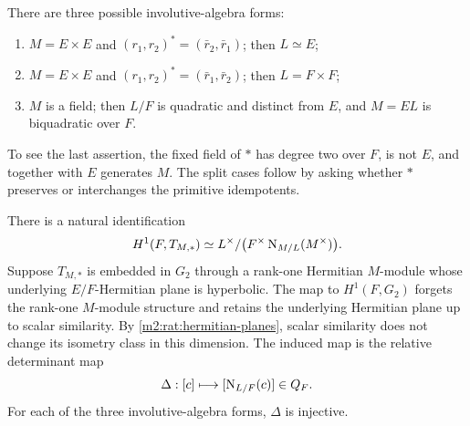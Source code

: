 There are three possible involutive-algebra forms:
\begin{enumerate}
 \item $M=E\times E$ and
 $(r_1,r_2)^*=(\bar r_2,\bar r_1)$; then $L\simeq E$;
 \item $M=E\times E$ and
 $(r_1,r_2)^*=(\bar r_1,\bar r_2)$; then $L=F\times F$;
 \item $M$ is a field; then $L/F$ is quadratic and distinct
 from $E$, and $M=EL$ is biquadratic over $F$.
\end{enumerate}
To see the last assertion, the fixed field of $*$ has degree
two over $F$, is not $E$, and together with $E$ generates $M$.
The split cases follow by asking whether $*$ preserves or
interchanges the primitive idempotents.

\begin{proposition}\label{m2:rat:torus-cohomology}
There is a natural identification
\begin{equation}\label{m2:rat:H1T}
 H^1(F,T_{M,*})
 \simeq L^\times/\bigl(F^\times\operatorname{N}_{M/L}(M^\times)\bigr).
\end{equation}
Suppose $T_{M,*}$ is embedded in $G_2$ through a rank-one
Hermitian $M$-module whose underlying $E/F$-Hermitian plane
is hyperbolic. The map to $H^1(F,G_2)$ forgets the rank-one
$M$-module structure and retains the underlying Hermitian plane
up to scalar similarity. By \cref{m2:rat:hermitian-planes}, scalar
similarity does not change its isometry class in this dimension.
The induced map is the relative determinant map
\begin{equation}\label{m2:rat:Delta}
 \Delta:[c]\longmapsto[\operatorname{N}_{L/F}(c)]\in Q_F.
\end{equation}
For each of the three involutive-algebra forms, $\Delta$ is
injective.
\end{proposition}

